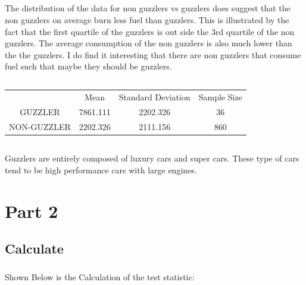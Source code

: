 \documentclass[letterpaper, onecolumn,10pt]{IEEEtran}
\begin{document}
            \subsection{}
            The distribution of the data for non guzzlers vs guzzlers does suggest that the non guzzlers on average burn less fuel than guzzlers. This is illustrated by the fact that the first quartile of the guzzlers is out side the 3rd quartile of the non guzzlers. The average consumption of the non guzzlers is also much lower than the the guzzlers. I do find it interesting that there are non guzzlers that consume fuel such that maybe they should be guzzlers.\\
            
            \subsection{}
            \begin{table}[ht]
                \centering
                \begin{tabular}{c|c|c|c}
                     & Mean & Standard Deviation & Sample Size\\
                     GUZZLER & 7861.111 & 2202.326 & 36\\
                     NON-GUZZLER & 2202.326 & 2111.156 & 860\\
                \end{tabular}
            \end{table}
            
            \subsection{}
            Guzzlers are entirely composed of luxury cars and super cars. These type of cars tend to be high performance cars with large engines.\\
            
            
        \section{Part 2}
            \subsection{Calculate}
                \subsubsection{}
                    Shown Below is the Calculation of the test statistic:
                    
\end{document}
